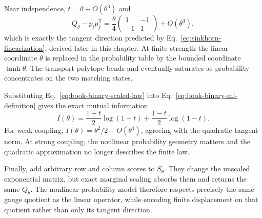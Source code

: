 Near independence, $t=\theta+O(\theta^3)$ and
\begin{equation}
Q_\theta-p_ip_j^{\mathsf T}
=\frac{\theta}{4}
\begin{pmatrix}
1&-1\\
-1&1
\end{pmatrix}
+O(\theta^3),
\label{eq:book-binary-tangent}
\end{equation}
which is exactly the tangent direction predicted by
Eq.~\ref{eq:sinkhorn-linearization}, derived later in this chapter.  At finite strength the linear coordinate $\theta$ is replaced
in the probability table by the bounded coordinate $\tanh\theta$.  The transport polytope bends
and eventually saturates as probability concentrates on the two matching states.

Substituting Eq.~\ref{eq:book-binary-scaled-law} into
Eq.~\ref{eq:book-binary-mi-definition} gives the exact mutual information
\begin{equation}
I(\theta)
=\frac{1+t}{2}\log(1+t)
+\frac{1-t}{2}\log(1-t).
\label{eq:book-binary-mutual-information}
\end{equation}
For weak coupling, $I(\theta)=\theta^2/2+O(\theta^4)$, agreeing with the quadratic tangent norm.
At strong coupling, the nonlinear probability geometry matters and the quadratic approximation no
longer describes the finite law.

Finally, add arbitrary row and column scores to $S_\theta$.  They change the unscaled exponential
matrix, but exact marginal scaling absorbs them and returns the same $Q_\theta$.  The nonlinear
probability model therefore respects precisely the same gauge quotient as the linear operator,
while encoding finite displacement on that quotient rather than only its tangent direction.
